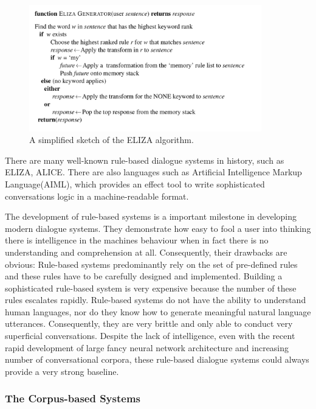 \documentclass[bsc,frontabs,twoside,singlespacing,parskip,deptreport]{infthesis}     %
\begin{document}
\begin{figure}[h]
    \centering
    \includegraphics[width=0.9\textwidth]{elizarule.jpeg}
    \caption{A simplified sketch of the ELIZA algorithm.}
    \label{fig:elizarule}
\end{figure}

There are many well-known rule-based dialogue systems in history, such as ELIZA\cite{weizenbaum1966eliza}, ALICE\cite{wallace1995artificial}. There are also languages such as Artificial Intelligence Markup Language(AIML), which provides an effect tool to write sophisticated conversations logic in a machine-readable format\cite{wallace1995artificial}.

The development of rule-based systems is a important milestone in developing modern dialogue systems. They demonstrate how easy to fool a user into thinking there is intelligence in the machines behaviour when in fact there is no understanding and comprehension at all. Consequently, their drawbacks are obvious: Rule-based systems predominantly rely on the set of pre-defined rules and these rules have to be carefully designed and implemented. Building a sophisticated rule-based system is very expensive because the number of these rules escalates rapidly. Rule-based systems do not have the ability to understand human languages, nor do they know how to generate meaningful natural language utterances\cite{jiweilithesis}. Consequently, they are very brittle and only able to conduct very superficial conversations. Despite the lack of intelligence, even with the recent rapid development of large fancy neural network architecture and increasing number of conversational corpora, these rule-based dialogue systems could always provide a very strong baseline.


\subsubsection*{The Corpus-based Systems}
\end{document}
